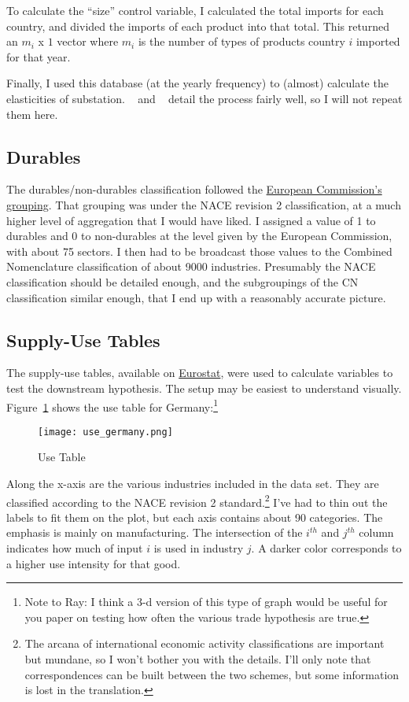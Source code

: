\documentclass[11pt]{article}
\begin{document}
  To calculate the ``size'' control variable, I calculated the total imports for each country, and divided the imports of each product into that total.  This returned an $m_i$ x $1$ vector where $m_i$ is the number of types of products country $i$ imported for that year.

  Finally, I used this database (at the yearly frequency) to (almost) calculate the elasticities of substation. ~\cite{weinstein-broda:2004} and ~\cite{feenstra:1994} detail the process fairly well, so I will not repeat them here.
\subsection{Durables} %
\label{sub:durables}
  The durables/non-durables classification followed the \href{http://eur-lex.europa.eu/LexUriServ/LexUriServ.do?uri=OJ:L:2007:155:0003:0006:EN:PDF}{European Commission's grouping}.  That grouping was under the NACE revision 2 classification, at a much higher level of aggregation that I would have liked. I assigned a value of 1 to durables and 0 to non-durables at the level given by the European Commission, with about 75 sectors. I then had to be broadcast those values to the Combined Nomenclature classification of about 9000 industries.  Presumably the NACE classification should be detailed enough, and the subgroupings of the CN classification similar enough, that I end up with a reasonably accurate picture.

\subsection{Supply-Use Tables}
\label{sub:supply_use_tables}

  The supply-use tables, available on \href{http://appsso.eurostat.ec.europa.eu/nui/show.do?dataset=naio_cp16_r2&lang=en}{Eurostat}, were used to calculate variables to test the downstream hypothesis.  The setup may be easiest to understand visually.  Figure~\ref{fig:use_germany} shows the use table for Germany:\footnote{Note to Ray: I think a 3-d version of this type of graph would be useful for you paper on testing how often the various trade hypothesis are true.}

  \begin{figure}[ht]
    \centering
      \texttt{[image: use\_germany.png]}
    \caption{Use Table}
    \label{fig:use_germany}
  \end{figure}

  Along the x-axis are the various industries included in the data set.  They are classified according to the NACE revision 2 standard.\footnote{The arcana of international economic activity classifications are important but mundane, so I won't bother you with the details.  I'll only note that correspondences can be built between the two schemes, but some information is lost in the translation.}  I've had to thin out the labels to fit them on the plot, but each axis contains about 90 categories.  The emphasis is mainly on manufacturing.  The intersection of the $i^{th}$ and $j^{th}$ column indicates how much of input $i$ is used in industry $j$.  A darker color corresponds to a higher use intensity for that good.
\end{document}
